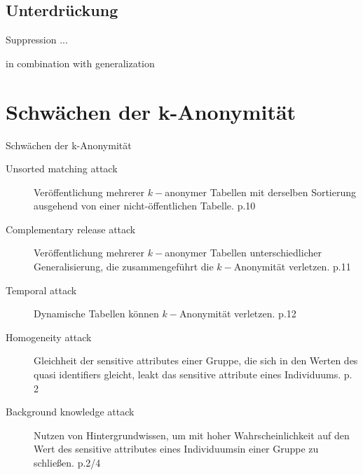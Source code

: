 \subsection{Unterdrückung}

\begin{frame}{Suppression}
	...
	
	in combination with generalization
\end{frame}

\section{Schwächen der k-Anonymität}

\begin{frame}{Schwächen der k-Anonymität}

\begin{description}
	\item[Unsorted matching attack] Veröffentlichung mehrerer \(k-\)anonymer Tabellen mit derselben Sortierung ausgehend von einer nicht-öffentlichen Tabelle. \cite{sweeney_k_anonymity} p.10
	\item[Complementary release attack] Veröffentlichung mehrerer \(k-\)anonymer Tabellen unterschiedlicher Generalisierung, die zusammengeführt die \(k-\)Anonymität verletzen. \cite{sweeney_k_anonymity} p.11
	\item[Temporal attack] Dynamische Tabellen können \(k-\)Anonymität verletzen. \cite{sweeney_k_anonymity} p.12
	\item[Homogeneity attack] Gleichheit der sensitive attributes einer Gruppe, die sich in den Werten des quasi identifiers gleicht, leakt das sensitive attribute eines Individuums. \cite{machanavajjhala_l_diversity} p. 2
	\item[Background knowledge attack] Nutzen von Hintergrundwissen, um mit hoher Wahrscheinlichkeit auf den Wert des sensitive attributes eines Individuumsin einer Gruppe zu schließen. \cite{machanavajjhala_l_diversity} p.2/4
\end{description}

\end{frame}